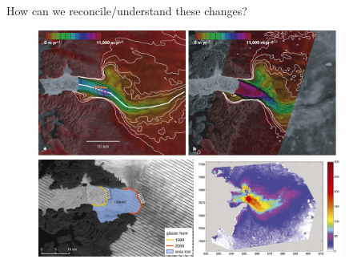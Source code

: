 \documentclass[hide notes,intlimits]{beamer}
\begin{document}
\begin{frame}{How can we reconcile/understand these changes?}
 \begin{figure}
    \includegraphics[height=4.15cm]{Joughin2004Fig2} \\
    \includegraphics[height=3.20cm]{jib-front-1990-2005-change}
    \includegraphics[height=3.20cm]{jib-obs-surface-diff-motyka}
  \end{figure}
\end{frame}
\end{document}
